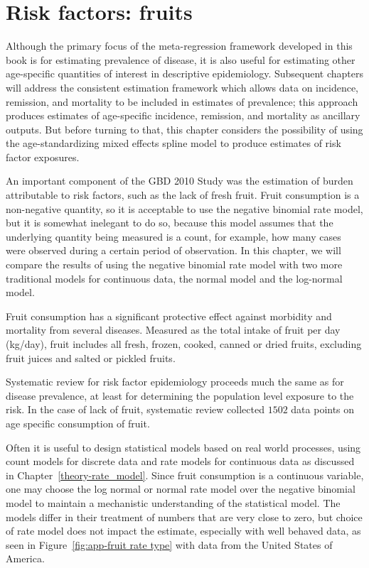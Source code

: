 \chapter{Risk factors: fruits}
\label{applications-log_normal}

Although the primary focus of the meta-regression framework developed
in this book is for estimating prevalence of disease, it is also
useful for estimating other age-specific quantities of interest in
descriptive epidemiology.  Subsequent chapters will address the
consistent estimation framework which allows data on incidence,
remission, and mortality to be included in estimates of prevalence;
this approach produces estimates of age-specific incidence, remission,
and mortality as ancillary outputs.  But before turning to that,
this chapter considers the possibility of using the
age-standardizing mixed effects spline model to produce estimates of
risk factor exposures.

An important component of the GBD 2010 Study
was the estimation of burden attributable to risk factors, such as
the lack of fresh fruit.  Fruit consumption is a non-negative
quantity, so it is acceptable to use
the negative binomial rate model, but it is somewhat inelegant to
do so, because this model assumes that the underlying quantity being
measured is a count, for example, how many cases were observed during a
certain period of observation.  In this chapter, we will compare the results of
using the negative binomial rate model with two more traditional
models for continuous data, the normal model and the log-normal model.

Fruit consumption has a significant protective
effect against morbidity and mortality from several diseases.
Measured as the total intake of fruit per day (kg/day), fruit
includes all fresh, frozen, cooked, canned or dried fruits, excluding
fruit juices and salted or pickled fruits. \cite{he_increased_2007,
  boeing_intake_2006}

Systematic review for
risk factor epidemiology proceeds much the same as for disease
prevalence, at least for determining the population level exposure to
the risk.  In the case of lack of fruit, systematic review collected
$1502$ data points on age specific consumption of fruit.

Often it is useful to design statistical models based on real world
processes, using count models for discrete data and rate models for
continuous data as discussed in Chapter~\ref{theory-rate_model}.
Since fruit consumption is a continuous variable, one may choose the
log normal or normal rate model over the negative binomial model to
maintain a mechanistic understanding of the statistical model.  The
models differ in their treatment of numbers that are very close to
zero, but choice of rate model does not impact the estimate,
especially with well behaved data, as seen in
Figure~\ref{fig:app-fruit rate type} with data from the United States of
America.

